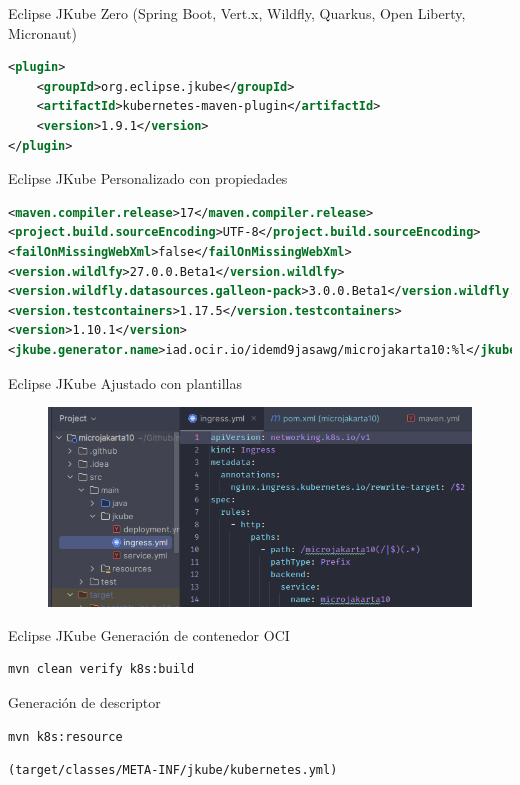 \documentclass[aspectratio=169]{beamer}
\begin{document}
\begin{frame}[fragile]{Eclipse JKube}
Zero (Spring Boot, Vert.x, Wildfly, Quarkus, Open Liberty, Micronaut)
\begin{lstlisting}[language=XML]
<plugin>
    <groupId>org.eclipse.jkube</groupId>
    <artifactId>kubernetes-maven-plugin</artifactId>
    <version>1.9.1</version>
</plugin>
\end{lstlisting}

\end{frame}

\begin{frame}[fragile]{Eclipse JKube}
Personalizado con propiedades
\begin{lstlisting}[language=XML]
<maven.compiler.release>17</maven.compiler.release>
<project.build.sourceEncoding>UTF-8</project.build.sourceEncoding>
<failOnMissingWebXml>false</failOnMissingWebXml>
<version.wildlfy>27.0.0.Beta1</version.wildlfy>
<version.wildfly.datasources.galleon-pack>3.0.0.Beta1</version.wildfly.datasources.galleon-pack>
<version.testcontainers>1.17.5</version.testcontainers>
<version>1.10.1</version>
<jkube.generator.name>iad.ocir.io/idemd9jasawg/microjakarta10:%l</jkube.generator.name>
\end{lstlisting}

\end{frame}



\begin{frame}[fragile]{Eclipse JKube}
Ajustado con plantillas

\begin{figure}
\centering
\includegraphics[width=0.7\linewidth]{Images/plantillas}

\end{figure}


\end{frame}

\begin{frame}[fragile]{Eclipse JKube}
Generación de contenedor OCI
\begin{lstlisting}[language=bash]
mvn clean verify k8s:build
\end{lstlisting}

Generación de descriptor 
\begin{lstlisting}[language=bash]
mvn k8s:resource
\end{lstlisting}
\begin{verbatim}
(target/classes/META-INF/jkube/kubernetes.yml)
\end{verbatim}
\end{frame}
\end{document}
